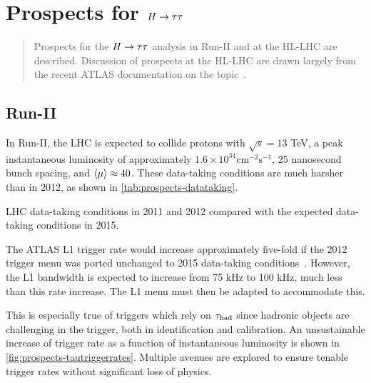 \chapter[Prospects for $\Htautau$][Prospects for $\Htautau$]{Prospects for $\Htautau$}
\label{chap:prospects}

\begin{quote}
  Prospects for the $\Htautau$ analysis in Run-II and at the HL-LHC are described. Discussion of prospects at the HL-LHC are drawn largely from the recent ATLAS documentation on the topic~\cite{ATL-PHYS-PUB-2014-018}.
\end{quote}

\section{Run-II}
\label{sec:prospects-run2}

In Run-II, the LHC is expected to collide protons with $\sqrt{s} = 13$ TeV, a peak instantaneous luminosity of approximately $1.6\times 10^{34} \text{cm}^{-2} \text{s}^{-1}$, 25 nanosecond bunch spacing, and $\langle\mu\rangle\approx 40$. These data-taking conditions are much harsher than in 2012, as shown in \cref{tab:prospects-datataking}.

\begin{table}[bp] 
  \centering
  \renewcommand{\arraystretch}{1.4}
  \caption{LHC data-taking conditions in 2011 and 2012 compared with the expected data-taking conditions in 2015.}
  
  \label{tab:prospects-datataking}
\end{table}

The ATLAS L1 trigger rate would increase approximately five-fold if the 2012 trigger menu was ported unchanged to 2015 data-taking conditions~\cite{ATL-COM-DAQ-2014-054}. However, the L1 bandwidth is expected to increase from 75 kHz to 100 kHz, much less than this rate increase. The L1 menu must then be adapted to accommodate this.

This is especially true of triggers which rely on $\tau_\text{had}$ since hadronic objects are challenging in the trigger, both in identification and calibration. An unsustainable increase of trigger rate as a function of instantaneous luminosity is shown in \cref{fig:prospects-tautriggerrates}. Multiple avenues are explored to ensure tenable trigger rates without significant loss of physics.

